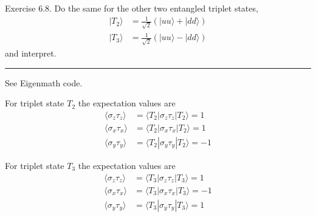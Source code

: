 \documentclass[12pt]{article}
\begin{document}
Exercise 6.8.
Do the same for the other two entangled triplet states,
\begin{align*}
|T_2\rangle&=\frac{1}{\sqrt2}\left(|uu\rangle+|dd\rangle\right)
\\[1ex]
|T_3\rangle&=\frac{1}{\sqrt2}\left(|uu\rangle-|dd\rangle\right)
\end{align*}
and interpret.

\bigskip
\hrule

\bigskip
See Eigenmath code.

\bigskip
For triplet state $T_2$ the expectation values are
\begin{align*}
\langle\sigma_z\tau_z\rangle&=\langle T_2|\sigma_z\tau_z|T_2\rangle=1
\\[1ex]
\langle\sigma_x\tau_x\rangle&=\langle T_2|\sigma_x\tau_x|T_2\rangle=1
\\[1ex]
\langle\sigma_y\tau_y\rangle&=\langle T_2|\sigma_y\tau_y|T_2\rangle=-1
\end{align*}

For triplet state $T_3$ the expectation values are
\begin{align*}
\langle\sigma_z\tau_z\rangle&=\langle T_3|\sigma_z\tau_z|T_3\rangle=1
\\[1ex]
\langle\sigma_x\tau_x\rangle&=\langle T_3|\sigma_x\tau_x|T_3\rangle=-1
\\[1ex]
\langle\sigma_y\tau_y\rangle&=\langle T_3|\sigma_y\tau_y|T_3\rangle=1
\end{align*}
\end{document}
